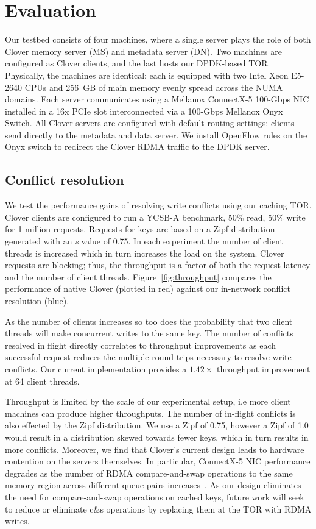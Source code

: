 \section{Evaluation}

Our testbed consists of four machines, where a single
server plays the role of both Clover memory server (MS) and metadata
server (DN).  Two machines are configured as Clover clients, and the
last hosts our DPDK-based TOR.  Physically, the machines
are identical: each is equipped with two Intel Xeon E5-2640 CPUs and
256~GB of main memory evenly spread across the NUMA domains. Each
server communicates using a Mellanox ConnectX-5 100-Gbps NIC installed
in a 16x PCIe slot interconnected via a 100-Gbps Mellanox Onyx Switch.
All Clover servers are configured with default routing settings:
clients send directly to the metadata and data server.  We install
OpenFlow rules on the Onyx switch to redirect the Clover RDMA traffic
to the DPDK server.

\subsection{Conflict resolution}

We test the performance gains of resolving write conflicts using our
caching TOR. Clover clients are configured to run a YCSB-A benchmark,
50\% read, 50\% write for 1 million requests. Requests for keys are
based on a Zipf distribution generated with an \textit{s} value of
0.75.
In each experiment the
number of client threads is increased which in turn increases the load
on the system. Clover requests are blocking; thus, the throughput is a
factor of both the request latency and the number of client
threads. Figure~\ref{fig:throughput} compares the performance of
native Clover (plotted in red) against our in-network conflict
resolution (blue).

As the number of clients increases so too does the probability that
two client threads will make concurrent writes to the same key. The
number of conflicts resolved in flight directly correlates to
throughput improvements as each successful request reduces the
multiple round trips necessary to resolve write conflicts. Our current
implementation provides a $1.42\times$ throughput improvement at 64
client threads.

Throughput is limited by the scale of our experimental setup, i.e more
client machines can produce higher throughputs.  
%
%
  The number of in-flight conflicts
is also effected by the Zipf distribution. We use a Zipf of 0.75,
however a Zipf of 1.0 would result in a distribution skewed towards
fewer keys, which in turn results in more conflicts. Moreover, we find
that Clover's current design leads to hardware contention on the
servers themselves.  In particular, ConnectX-5 NIC performance
degrades as the number of RDMA compare-and-swap operations to the same
memory region across different queue pairs
increases~\cite{design-guidelines}. As our design eliminates the need
for compare-and-swap operations on cached keys, future work will seek
to reduce or eliminate c\&s operations by replacing them at the TOR
with RDMA writes.

